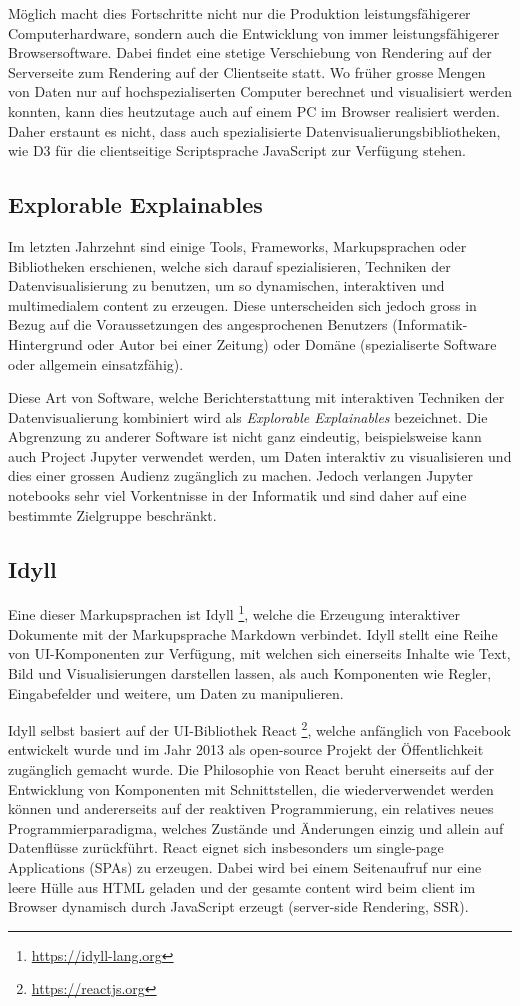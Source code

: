 \documentclass[a4paper,10.2pt,pdftex]{scrartcl}%
\begin{document}
Möglich macht dies Fortschritte nicht nur die Produktion leistungsfähigerer Computerhardware, sondern auch die Entwicklung von immer leistungsfähigerer Browsersoftware. Dabei findet eine stetige Verschiebung von Rendering auf der Serverseite zum Rendering auf der Clientseite statt. Wo früher grosse Mengen von Daten nur auf hochspezialiserten Computer berechnet und visualisiert werden konnten, kann dies heutzutage auch auf einem PC im Browser realisiert werden. Daher erstaunt es nicht, dass auch spezialisierte Datenvisualierungsbibliotheken, wie D3 für die clientseitige Scriptsprache JavaScript zur Verfügung stehen.

\subsection{Explorable Explainables}
Im letzten Jahrzehnt sind einige Tools, Frameworks, Markupsprachen oder Bibliotheken erschienen, welche sich darauf spezialisieren, Techniken der Datenvisualisierung zu benutzen, um so dynamischen, interaktiven und multimedialem content zu erzeugen. Diese unterscheiden sich jedoch gross in Bezug auf die Voraussetzungen des angesprochenen Benutzers (Informatik-Hintergrund oder Autor bei einer Zeitung) oder Domäne (spezialiserte Software oder allgemein einsatzfähig).

Diese Art von Software, welche Berichterstattung mit interaktiven Techniken der Datenvisualierung kombiniert wird als \emph{Explorable Explainables} bezeichnet. Die Abgrenzung zu anderer Software ist nicht ganz eindeutig, beispielsweise kann auch Project Jupyter verwendet werden, um Daten interaktiv zu visualisieren und dies einer grossen Audienz zugänglich zu machen. Jedoch verlangen Jupyter notebooks sehr viel Vorkentnisse in der Informatik und sind daher auf eine bestimmte Zielgruppe beschränkt. 
\subsection{Idyll}
Eine dieser Markupsprachen ist Idyll \footnote{\url{https://idyll-lang.org}}, welche die Erzeugung interaktiver Dokumente mit der Markupsprache Markdown verbindet. Idyll stellt eine Reihe von UI-Komponenten zur Verfügung, mit welchen sich einerseits Inhalte wie Text, Bild und Visualisierungen darstellen lassen, als auch Komponenten wie Regler, Eingabefelder und weitere, um Daten zu manipulieren.

Idyll selbst basiert auf der UI-Bibliothek React \footnote{\url{https://reactjs.org}}, welche anfänglich von Facebook entwickelt wurde und im Jahr 2013 als open-source Projekt der Öffentlichkeit zugänglich gemacht wurde. Die Philosophie von React beruht einerseits auf der Entwicklung von Komponenten mit Schnittstellen, die wiederverwendet werden können und andererseits auf der reaktiven Programmierung, ein relatives neues Programmierparadigma, welches Zustände und Änderungen einzig und allein auf Datenflüsse zurückführt. React eignet sich insbesonders um single-page Applications (SPAs) zu erzeugen. Dabei wird bei einem Seitenaufruf nur eine leere Hülle aus HTML geladen und der gesamte content wird beim client im Browser dynamisch durch JavaScript erzeugt (server-side Rendering, SSR).
\end{document}
